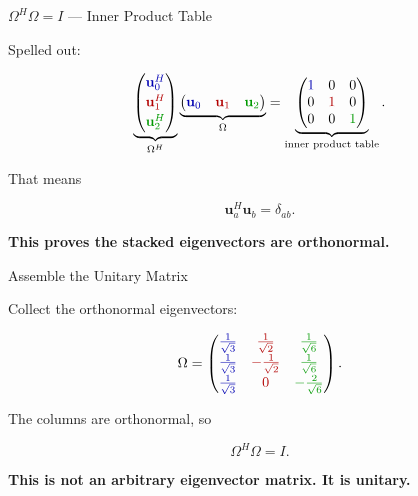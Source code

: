 \documentclass[10pt]{beamer}
\theoremstyle{definition}
\newcommand{\x}[1]{\alert{\textbf{#1}}}
\newcommand{\rd}[1]{{\color{red!70!black}#1}}
\newcommand{\bl}[1]{{\color{blue!70!black}#1}}
\newcommand{\gn}[1]{{\color{green!60!black}#1}}
\begin{document}
\begin{frame}{$\Omega^H\Omega=I$ --- Inner Product Table}

Spelled out:

$$
\underbrace{
\begin{pmatrix}
\bl{\mathbf{u}_0^H}\\[2pt]
\rd{\mathbf{u}_1^H}\\[2pt]
\gn{\mathbf{u}_2^H}
\end{pmatrix}
}_{\Omega^H}
\underbrace{
\begin{pmatrix}
\bl{\mathbf{u}_0}&\rd{\mathbf{u}_1}&\gn{\mathbf{u}_2}
\end{pmatrix}
}_{\Omega}
=
\underbrace{
\begin{pmatrix}
\bl{1}&0&0\\
0&\rd{1}&0\\
0&0&\gn{1}
\end{pmatrix}
}_{\text{inner product table}}.
$$

\vfill\pause

That means

$$
\mathbf{u}_a^H\mathbf{u}_b=\delta_{ab}.
$$

\vfill

\x{This proves the stacked eigenvectors are orthonormal.}

\end{frame}


\begin{frame}{Assemble the Unitary Matrix}

Collect the orthonormal eigenvectors:

$$
\Omega=
\begin{pmatrix}
\bl{\frac1{\sqrt3}}&\rd{\frac1{\sqrt2}}&\gn{\frac1{\sqrt6}}\\[1mm]
\bl{\frac1{\sqrt3}}&\rd{-\frac1{\sqrt2}}&\gn{\frac1{\sqrt6}}\\[1mm]
\bl{\frac1{\sqrt3}}&\rd{0}&\gn{-\frac2{\sqrt6}}
\end{pmatrix}.
$$

\vfill\pause

The columns are orthonormal, so

$$
\Omega^H\Omega=I.
$$

\vfill

\x{This is not an arbitrary eigenvector matrix. It is unitary.}

\end{frame}
\end{document}
